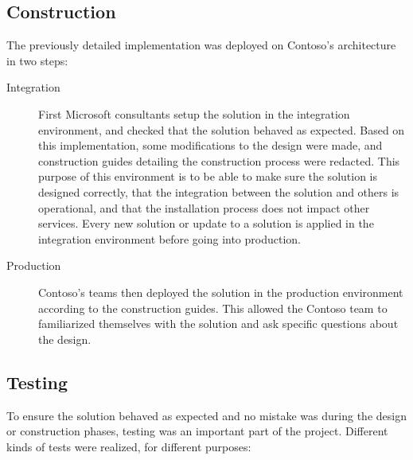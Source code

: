 \subsection{Construction}
	The previously detailed implementation was deployed on Contoso's architecture in two steps: 
	\begin{description}
		\item[Integration] First Microsoft consultants setup the solution in the integration environment, and checked that the solution behaved as expected. Based on this implementation, some modifications to the design were made, and construction guides detailing the construction process were redacted. This purpose of this environment is to be able to make sure the solution is designed correctly, that the integration between the solution and others is operational, and that the installation process does not impact other services. Every new solution or update to a solution is applied in the integration environment before going into production. 
		
		\item[Production] Contoso's teams then deployed the solution in the production environment according to the construction guides. This allowed the Contoso team to familiarized themselves with the solution and ask specific questions about the design.
	\end{description}


\subsection{Testing}
	To ensure the solution behaved as expected and no mistake was during the design or construction phases, testing was an important part of the project. Different kinds of tests were realized, for different purposes:
	
